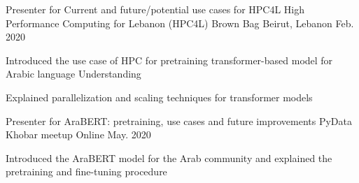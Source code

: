 

\begin{cventries}

  \cventry
    {Presenter for Current and future/potential use cases for HPC4L} %
    {High Performance Computing for Lebanon (HPC4L) Brown Bag} %
    {Beirut, Lebanon} %
    {Feb. 2020} %
    {
      \begin{cvitems} %
        \item {Introduced the use case of HPC for pretraining transformer-based model for Arabic language Understanding}
        \item {Explained parallelization and scaling techniques for transformer models}
      \end{cvitems}
    }

  \cventry
    {Presenter for AraBERT: pretraining, use cases and future improvements} %
    {PyData Khobar meetup} %
    {Online} %
    {May. 2020} %
    {
      \begin{cvitems} %
        \item {Introduced the AraBERT model for the Arab community and explained the pretraining and fine-tuning procedure}
      \end{cvitems}
    }

\end{cventries}
